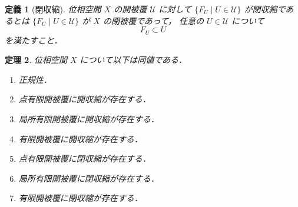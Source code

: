 \documentclass[leqno, 12pt]{ltjsarticle}
\newtheorem{thm}{定理}
\newtheorem{df}[thm]{定義}
\begin{document}
\begin{df}[閉収縮]
位相空間
$X$
の開被覆
$\mathcal{U}$
に対して
$\{F_{U} \mid U\in \mathcal{U}\}$
が閉収縮であるとは
$\{F_{U} \mid U\in \mathcal{U}\}$
が
$X$
の閉被覆であって，
任意の
$U\in \mathcal{U}$
について
\[
F_{U}\subset U
\]
を満たすこと．
\end{df}
\begin{thm}\label{thm:normal}
位相空間
$X$
について以下は同値である．
\begin{enumerate}[label=\textup{(\arabic*)}]
\item\label{item:0723:normal}
正規性．
\item\label{item:0723:ptfinopenshrink}
 点有限開被覆に開収縮が存在する．
\item\label{item:0723:locfinopenshrink}
局所有限開被覆に開収縮が存在する．
\item\label{item:finopenshrink}
 有限開被覆に開収縮が存在する．
\item\label{item:0723:ptfinclosedshrink}
点有限開被覆に閉収縮が存在する．
\item\label{item:0723:locfinclosedshrink}
局所有限開被覆に閉収縮が存在する．
\item\label{item:0723:finclosedshrink}
有限開被覆に閉収縮が存在する．
\end{enumerate}
\end{thm}
\end{document}
